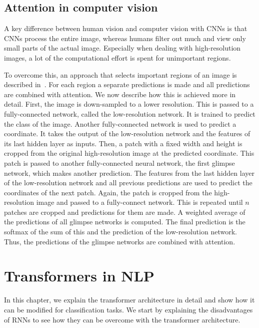 \documentclass[a4paper]{scrartcl}
\let\stdsection\section
\renewcommand\section{\newpage\stdsection}
\begin{document}
    \subsection{Attention in computer vision}\label{subsec:attention-in-computer-vision}
    A key difference between human vision and computer vision with CNNs is that CNNs process the entire image, whereas humans filter out much and view only small parts of the actual image.
    Especially when dealing with high-resolution images, a lot of the computational effort is spent for unimportant regions.

    To overcome this, an approach that selects important regions of an image is described in~\cite{ranzato2014learning}.
    For each region a separate predictions is made and all predictions are combined with attention.
    We now describe how this is achieved more in detail.
    First, the image is down-sampled to a lower resolution.
    This is passed to a fully-connected network, called the low-resolution network.
    It is trained to predict the class of the image.
    Another fully-connected network is used to predict a coordinate.
    It takes the output of the low-resolution network and the features of its last hidden layer as inputs.
    Then, a patch with a fixed width and height is cropped from the original high-resolution image at the predicted coordinate.
    This patch is passed to another fully-connected neural network, the first glimpse network, which makes another prediction.
    The features from the last hidden layer of the low-resolution network and all previous predictions are used to predict the coordinates of the next patch.
    Again, the patch is cropped from the high-resolution image and passed to a fully-connect network.
    This is repeated until $n$ patches are cropped and predictions for them are made.
    A weighted average of the predictions of all glimpse networks is computed.
    The final prediction is the softmax of the sum of this and the prediction of the low-resolution network.
    Thus, the predictions of the glimpse networks are combined with attention.



    \section{Transformers in NLP}\label{sec:transformers-in-nlp}
    In this chapter, we explain the transformer architecture in detail and show how it can be modified for classification tasks.
    We start by explaining the disadvantages of RNNs to see how they can be overcome with the transformer architecture.
\end{document}
